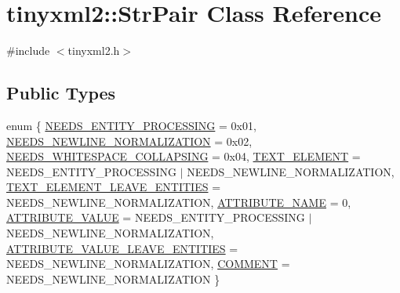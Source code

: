\hypertarget{classtinyxml2_1_1_str_pair}{}\section{tinyxml2\+:\+:Str\+Pair Class Reference}
\label{classtinyxml2_1_1_str_pair}


{\ttfamily \#include $<$tinyxml2.\+h$>$}

\subsection*{Public Types}
\begin{DoxyCompactItemize}
\item 
enum \{ \newline
\mbox{\hyperlink{classtinyxml2_1_1_str_pair_a0301ef962e15dd94574431f1c61266c5a4f1e01a55f8efe4ca72c32d454060237}{N\+E\+E\+D\+S\+\_\+\+E\+N\+T\+I\+T\+Y\+\_\+\+P\+R\+O\+C\+E\+S\+S\+I\+NG}} = 0x01, 
\mbox{\hyperlink{classtinyxml2_1_1_str_pair_a0301ef962e15dd94574431f1c61266c5a8f2045d56e70745d718672c0da91d0e0}{N\+E\+E\+D\+S\+\_\+\+N\+E\+W\+L\+I\+N\+E\+\_\+\+N\+O\+R\+M\+A\+L\+I\+Z\+A\+T\+I\+ON}} = 0x02, 
\mbox{\hyperlink{classtinyxml2_1_1_str_pair_a0301ef962e15dd94574431f1c61266c5a13996e9d4ed18fd2d6af59bbab291b63}{N\+E\+E\+D\+S\+\_\+\+W\+H\+I\+T\+E\+S\+P\+A\+C\+E\+\_\+\+C\+O\+L\+L\+A\+P\+S\+I\+NG}} = 0x04, 
\mbox{\hyperlink{classtinyxml2_1_1_str_pair_a0301ef962e15dd94574431f1c61266c5aae519eb5a639858591763aa5fc6cc953}{T\+E\+X\+T\+\_\+\+E\+L\+E\+M\+E\+NT}} = N\+E\+E\+D\+S\+\_\+\+E\+N\+T\+I\+T\+Y\+\_\+\+P\+R\+O\+C\+E\+S\+S\+I\+NG $\vert$ N\+E\+E\+D\+S\+\_\+\+N\+E\+W\+L\+I\+N\+E\+\_\+\+N\+O\+R\+M\+A\+L\+I\+Z\+A\+T\+I\+ON, 
\newline
\mbox{\hyperlink{classtinyxml2_1_1_str_pair_a0301ef962e15dd94574431f1c61266c5a96be48cf899bfeea0aa227f984f1fa63}{T\+E\+X\+T\+\_\+\+E\+L\+E\+M\+E\+N\+T\+\_\+\+L\+E\+A\+V\+E\+\_\+\+E\+N\+T\+I\+T\+I\+ES}} = N\+E\+E\+D\+S\+\_\+\+N\+E\+W\+L\+I\+N\+E\+\_\+\+N\+O\+R\+M\+A\+L\+I\+Z\+A\+T\+I\+ON, 
\mbox{\hyperlink{classtinyxml2_1_1_str_pair_a0301ef962e15dd94574431f1c61266c5aaab1cbefaa977e6f772b4e2575417aeb}{A\+T\+T\+R\+I\+B\+U\+T\+E\+\_\+\+N\+A\+ME}} = 0, 
\mbox{\hyperlink{classtinyxml2_1_1_str_pair_a0301ef962e15dd94574431f1c61266c5a6d72f9ce15f50e8bcd680edf66235dfd}{A\+T\+T\+R\+I\+B\+U\+T\+E\+\_\+\+V\+A\+L\+UE}} = N\+E\+E\+D\+S\+\_\+\+E\+N\+T\+I\+T\+Y\+\_\+\+P\+R\+O\+C\+E\+S\+S\+I\+NG $\vert$ N\+E\+E\+D\+S\+\_\+\+N\+E\+W\+L\+I\+N\+E\+\_\+\+N\+O\+R\+M\+A\+L\+I\+Z\+A\+T\+I\+ON, 
\mbox{\hyperlink{classtinyxml2_1_1_str_pair_a0301ef962e15dd94574431f1c61266c5a2decbd2513ac14f8befa987938326399}{A\+T\+T\+R\+I\+B\+U\+T\+E\+\_\+\+V\+A\+L\+U\+E\+\_\+\+L\+E\+A\+V\+E\+\_\+\+E\+N\+T\+I\+T\+I\+ES}} = N\+E\+E\+D\+S\+\_\+\+N\+E\+W\+L\+I\+N\+E\+\_\+\+N\+O\+R\+M\+A\+L\+I\+Z\+A\+T\+I\+ON, 
\newline
\mbox{\hyperlink{classtinyxml2_1_1_str_pair_a0301ef962e15dd94574431f1c61266c5a067a6ec90c8beea1cf5992930d93bffa}{C\+O\+M\+M\+E\+NT}} = N\+E\+E\+D\+S\+\_\+\+N\+E\+W\+L\+I\+N\+E\+\_\+\+N\+O\+R\+M\+A\+L\+I\+Z\+A\+T\+I\+ON
 \}
\end{DoxyCompactItemize}
